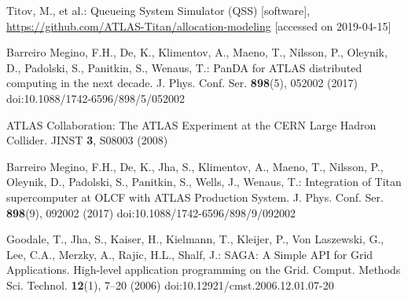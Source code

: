 Titov, M., et al.: Queueing System Simulator (QSS) [software], \url{https://github.com/ATLAS-Titan/allocation-modeling} [accessed on 2019-04-15]

Barreiro Megino, F.H., De, K., Klimentov, A., Maeno, T., Nilsson, P., Oleynik, D., Padolski, S., Panitkin, S., Wenaus, T.: PanDA for ATLAS distributed computing in the next decade. J. Phys. Conf. Ser. \textbf{898}(5), 052002 (2017) doi:10.1088/1742-6596/898/5/052002

ATLAS Collaboration: The ATLAS Experiment at the CERN Large Hadron Collider. JINST \textbf{3}, S08003 (2008)

Barreiro Megino, F.H., De, K., Jha, S., Klimentov, A., Maeno, T., Nilsson, P., Oleynik, D., Padolski, S., Panitkin, S., Wells, J., Wenaus, T.: Integration of Titan supercomputer at OLCF with ATLAS Production System. J. Phys. Conf. Ser. \textbf{898}(9), 092002 (2017) doi:10.1088/1742-6596/898/9/092002

Goodale, T., Jha, S., Kaiser, H., Kielmann, T., Kleijer, P., Von Laszewski, G., Lee, C.A., Merzky, A., Rajic, H.L., Shalf, J.: SAGA: A Simple API for Grid Applications. High-level application programming on the Grid. Comput. Methods Sci. Technol. \textbf{12}(1), 7--20 (2006) doi:10.12921/cmst.2006.12.01.07-20
